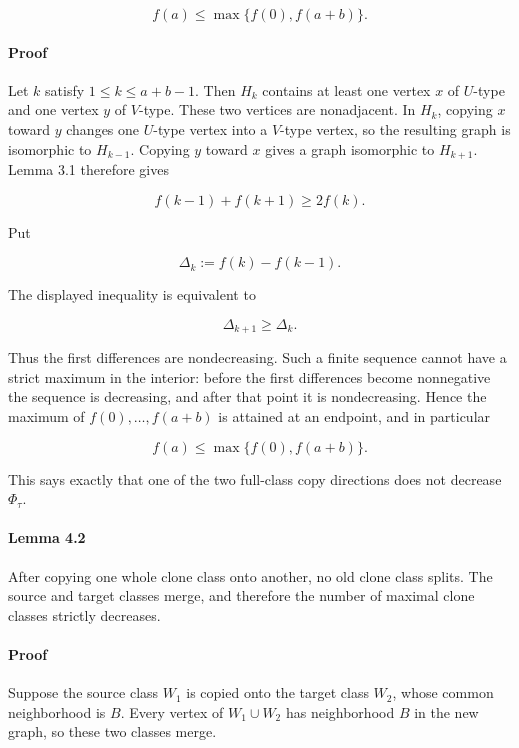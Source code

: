 \documentclass[english,11pt,a4paper]{article}
\begin{document}
\[
f(a)\le\max\{f(0),f(a+b)\}.
\]

\paragraph{Proof}\label{proof-2}

Let \(k\) satisfy \(1\le k\le a+b-1\). Then \(H_k\) contains at least
one vertex \(x\) of \(U\)-type and one vertex \(y\) of \(V\)-type. These
two vertices are nonadjacent. In \(H_k\), copying \(x\) toward \(y\)
changes one \(U\)-type vertex into a \(V\)-type vertex, so the resulting
graph is isomorphic to \(H_{k-1}\). Copying \(y\) toward \(x\) gives a
graph isomorphic to \(H_{k+1}\). Lemma 3.1 therefore gives

\[
f(k-1)+f(k+1)\ge2f(k).
\]

Put

\[
\Delta_k:=f(k)-f(k-1).
\]

The displayed inequality is equivalent to

\[
\Delta_{k+1}\ge\Delta_k.
\]

Thus the first differences are nondecreasing. Such a finite sequence
cannot have a strict maximum in the interior: before the first
differences become nonnegative the sequence is decreasing, and after
that point it is nondecreasing. Hence the maximum of
\(f(0),\ldots,f(a+b)\) is attained at an endpoint, and in particular

\[
f(a)\le\max\{f(0),f(a+b)\}.
\]

This says exactly that one of the two full-class copy directions does
not decrease \(\Phi_\tau\).

\paragraph{Lemma 4.2}\label{lemma-4.2}

After copying one whole clone class onto another, no old clone class
splits. The source and target classes merge, and therefore the number of
maximal clone classes strictly decreases.

\paragraph{Proof}\label{proof-3}

Suppose the source class \(W_1\) is copied onto the target class
\(W_2\), whose common neighborhood is \(B\). Every vertex of
\(W_1\cup W_2\) has neighborhood \(B\) in the new graph, so these two
classes merge.
\end{document}

